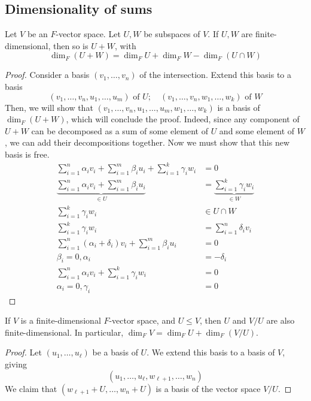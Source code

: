 \subsection{Dimensionality of sums}
\begin{proposition}
	Let \( V \) be an \( F \)-vector space.
	Let \( U, W \) be subspaces of \( V \).
	If \( U, W \) are finite-dimensional, then so is \( U + W \), with
	\[
		\dim_F (U + W) = \dim_F U + \dim_F W - \dim_F (U \cap W)
	\]
\end{proposition}
\begin{proof}
	Consider a basis \( (v_1, \dots, v_n) \) of the intersection.
	Extend this basis to a basis
	\[ (v_1, \dots, v_n, u_1, \dots, u_m) \text{ of } U;\quad (v_1, \dots, v_n, w_1, \dots, w_k) \text{ of } W \]
	Then, we will show that \( (v_1, \dots, v_n, u_1, \dots, u_m, w_1, \dots, w_k) \) is a basis of \( \dim_F (U + W) \), which will conclude the proof.
	Indeed, since any component of \( U + W \) can be decomposed as a sum of some element of \( U \) and some element of \( W \), we can add their decompositions together.
	Now we must show that this new basis is free.
	\begin{align*}
		\sum_{i=1}^n \alpha_i v_i + \sum_{i=1}^m \beta_i u_i + \sum_{i=1}^k \gamma_i w_i & = 0                                              \\
		\underbrace{\sum_{i=1}^n \alpha_i v_i + \sum_{i=1}^m \beta_i u_i}_{\in U}        & = \underbrace{\sum_{i=1}^k \gamma_i w_i}_{\in W} \\
		\sum_{i=1}^k \gamma_i w_i                                                        & \in U \cap W                                     \\
		\sum_{i=1}^k \gamma_i w_i                                                        & = \sum_{i=1}^n \delta_i v_i                      \\
		\sum_{i=1}^n (\alpha_i + \delta_i) v_i + \sum_{i=1}^m \beta_i u_i                & = 0                                              \\
		\beta_i = 0, \alpha_i                                                            & = -\delta_i                                      \\
		\sum_{i=1}^n \alpha_i v_i + \sum_{i=1}^k \gamma_i w_i                            & = 0                                              \\
		\alpha_i = 0, \gamma_i                                                           & = 0
	\end{align*}
\end{proof}
\begin{proposition}
	If \( V \) is a finite-dimensional \( F \)-vector space, and \( U \leq V \), then \( U \) and \( V / U \) are also finite-dimensional.
	In particular, \( \dim_F V = \dim_F U + \dim_F (V / U) \).
\end{proposition}
\begin{proof}
	Let \( (u_1, \dots, u_\ell) \) be a basis of \( U \).
	We extend this basis to a basis of \( V \), giving
	\[ (u_1, \dots, u_\ell, w_{\ell + 1}, \dots, w_n) \]
	We claim that \( (w_{\ell + 1} + U, \dots, w_n + U) \) is a basis of the vector space \( V / U \).
\end{proof}

